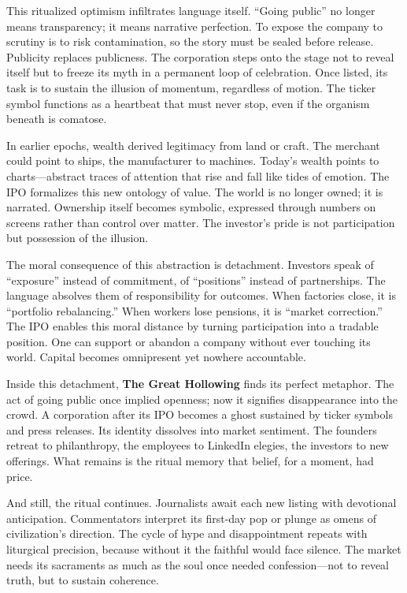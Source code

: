 \documentclass[11pt,twoside]{book}
\begin{document}
This ritualized optimism infiltrates language itself.  “Going public” no longer means transparency; it means narrative perfection.  To expose the company to scrutiny is to risk contamination, so the story must be sealed before release.  Publicity replaces publicness.  The corporation steps onto the stage not to reveal itself but to freeze its myth in a permanent loop of celebration.  Once listed, its task is to sustain the illusion of momentum, regardless of motion.  The ticker symbol functions as a heartbeat that must never stop, even if the organism beneath is comatose.

In earlier epochs, wealth derived legitimacy from land or craft.  The merchant could point to ships, the manufacturer to machines.  Today’s wealth points to charts—abstract traces of attention that rise and fall like tides of emotion.  The IPO formalizes this new ontology of value.  The world is no longer owned; it is narrated.  Ownership itself becomes symbolic, expressed through numbers on screens rather than control over matter.  The investor’s pride is not participation but possession of the illusion.

The moral consequence of this abstraction is detachment.  Investors speak of “exposure” instead of commitment, of “positions” instead of partnerships.  The language absolves them of responsibility for outcomes.  When factories close, it is “portfolio rebalancing.”  When workers lose pensions, it is “market correction.”  The IPO enables this moral distance by turning participation into a tradable position.  One can support or abandon a company without ever touching its world.  Capital becomes omnipresent yet nowhere accountable.

Inside this detachment, \textbf{The Great Hollowing} finds its perfect metaphor.  The act of going public once implied openness; now it signifies disappearance into the crowd.  A corporation after its IPO becomes a ghost sustained by ticker symbols and press releases.  Its identity dissolves into market sentiment.  The founders retreat to philanthropy, the employees to LinkedIn elegies, the investors to new offerings.  What remains is the ritual memory that belief, for a moment, had price.

And still, the ritual continues.  Journalists await each new listing with devotional anticipation.  Commentators interpret its first-day pop or plunge as omens of civilization’s direction.  The cycle of hype and disappointment repeats with liturgical precision, because without it the faithful would face silence.  The market needs its sacraments as much as the soul once needed confession—not to reveal truth, but to sustain coherence.
\end{document}
